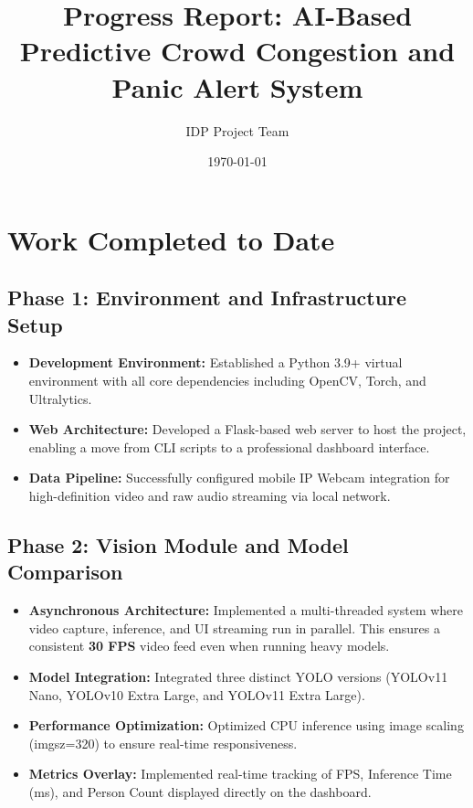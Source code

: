 \documentclass[12pt,a4paper]{article}
\title{\textbf{Progress Report: AI-Based Predictive Crowd Congestion and Panic Alert System}}
\author{IDP Project Team}
\date{\today}
\begin{document}
\maketitle

\section{Work Completed to Date}

\subsection{Phase 1: Environment and Infrastructure Setup}
\begin{itemize}
    \item \textbf{Development Environment:} Established a Python 3.9+ virtual environment with all core dependencies including OpenCV, Torch, and Ultralytics.
    \item \textbf{Web Architecture:} Developed a Flask-based web server to host the project, enabling a move from CLI scripts to a professional dashboard interface.
    \item \textbf{Data Pipeline:} Successfully configured mobile IP Webcam integration for high-definition video and raw audio streaming via local network.
\end{itemize}

\subsection{Phase 2: Vision Module and Model Comparison}
\begin{itemize}
    \item \textbf{Asynchronous Architecture:} Implemented a multi-threaded system where video capture, inference, and UI streaming run in parallel. This ensures a consistent \textbf{30 FPS} video feed even when running heavy models.
    \item \textbf{Model Integration:} Integrated three distinct YOLO versions (YOLOv11 Nano, YOLOv10 Extra Large, and YOLOv11 Extra Large).
    \item \textbf{Performance Optimization:} Optimized CPU inference using image scaling (imgsz=320) to ensure real-time responsiveness.
    \item \textbf{Metrics Overlay:} Implemented real-time tracking of FPS, Inference Time (ms), and Person Count displayed directly on the dashboard.
\end{itemize}
\end{document}
